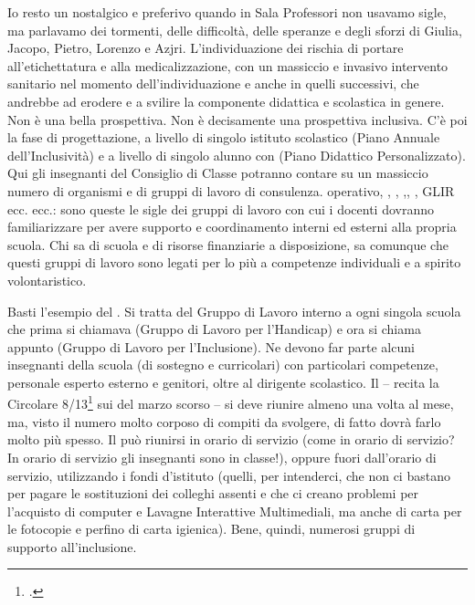 Io resto un nostalgico e preferivo quando in Sala Professori non usavamo sigle, ma parlavamo dei tormenti, delle difficoltà, delle speranze e degli sforzi di Giulia, Jacopo, Pietro, Lorenzo e Azjri. L'individuazione dei  rischia di portare all'etichettatura e alla medicalizzazione, con un massiccio e invasivo intervento sanitario nel momento dell'individuazione e anche in quelli successivi, che andrebbe ad erodere e a svilire la componente didattica e scolastica in genere. Non è una bella prospettiva. Non è decisamente una prospettiva inclusiva.
C'è poi la fase di progettazione, a livello di singolo istituto scolastico (Piano Annuale dell'Inclusività) e a livello di singolo alunno con  (Piano Didattico Personalizzato). Qui gli insegnanti del Consiglio di Classe potranno contare su un massiccio numero di organismi e di gruppi di lavoro di consulenza.   operativo, , , ,, , GLIR ecc. ecc.: sono queste le sigle dei gruppi di lavoro con cui i docenti dovranno familiarizzare per avere supporto e coordinamento interni ed esterni alla propria scuola. Chi sa di scuola e di risorse finanziarie a disposizione, sa comunque che questi gruppi di lavoro sono legati per lo più a competenze individuali e a spirito volontaristico.

Basti l'esempio del . Si tratta del Gruppo di Lavoro interno a ogni singola scuola che prima si chiamava  (Gruppo di Lavoro per l'Handicap) e ora si chiama appunto  (Gruppo di Lavoro per l'Inclusione). Ne devono far parte alcuni insegnanti della scuola (di sostegno e curricolari) con particolari competenze, personale esperto esterno e genitori, oltre al dirigente scolastico. Il  – recita la Circolare 8/13\footcite{cm8_2013} sui  del marzo scorso – si deve riunire almeno una volta al mese, ma, visto il numero molto corposo di compiti da svolgere, di fatto dovrà farlo molto più spesso. Il  può riunirsi in orario di servizio (come in orario di servizio? In orario di servizio gli insegnanti sono in classe!), oppure fuori dall'orario di servizio, utilizzando i fondi d'istituto (quelli, per intenderci, che non ci bastano per pagare le sostituzioni dei colleghi assenti e che ci creano problemi per l'acquisto di computer e Lavagne Interattive Multimediali, ma anche di carta per le fotocopie e perfino di carta igienica). Bene, quindi, numerosi gruppi di supporto all'inclusione.

